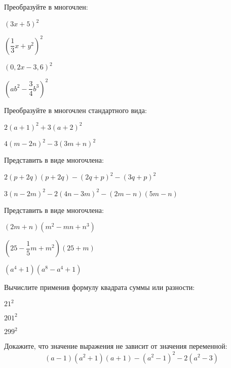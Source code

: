 \begin{listofex}
	\item {}
	\item Преобразуйте в многочлен:
	\begin{enumcols}[itemcolumns=4]
		\item \( (3x+5)^2 \)
		\item \( \left( \dfrac{1}{3}x+y^2 \right)^2 \)
		\item \( (0,2x-3,6)^2 \)
		\item \( \left( ab^2-\dfrac{3}{4}b^3 \right)^2 \)
	\end{enumcols}
	\item Преобразуйте в многочлен стандартного вида:
	\begin{enumcols}[itemcolumns=2]
		\item \( 2(a+1)^2 +3(a+2)^2\)
		\item \( 4(m-2n)^2-3(3m+n)^2 \)
	\end{enumcols}
	\item Представить в виде многочлена:
	\begin{enumcols}[itemcolumns=1]
		\item \( 2(p+2q)(p+2q)-(2q+p)^2-(3q+p)^2 \)
		\item \( 3(n-2m)^2-2(4n-3m)^2-(2m-n)(5m-n) \)
	\end{enumcols}
	\item Представить в виде многочлена:
	\begin{enumcols}[itemcolumns=3]
		\item \( (2m+n)(m^2-mn+n^3) \)
		\item \( \left( 25-\dfrac{1}{5}m+m^2 \right)(25+m) \)
		\item \( (a^4+1)(a^8-a^4+1) \)
	\end{enumcols}
	\item Вычислите применив формулу квадрата суммы или разности:
	\begin{enumcols}[itemcolumns=3]
		\item \( 21^2 \)
		\item \( 201^2 \)
		\item \( 299^2 \)
	\end{enumcols}
	\item Докажите, что значение выражения не зависит от значения переменной:
	\[ (a-1)(a^2+1)(a+1)-(a^2-1)^2-2(a^2-3) \]
\end{listofex}
%	
